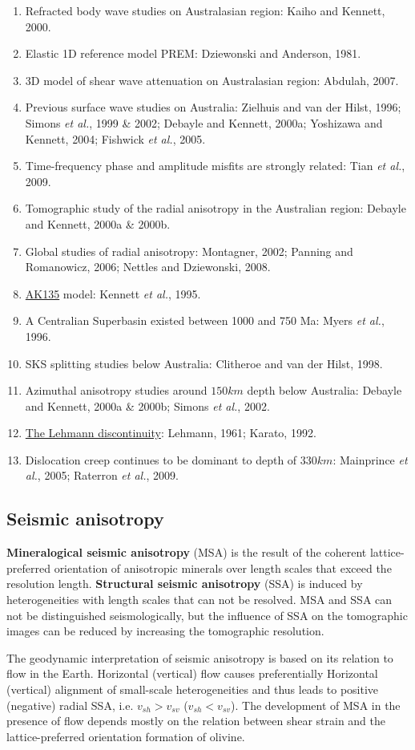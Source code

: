 \documentclass{article}
\newcommand{\myem}[1]{{\color{red}\uline{#1}}}
\newcommand{\etal}{\textit{et al.}}
\begin{document}
\begin{enumerate}[\hspace{10mm}*]
  \item Refracted body wave studies on Australasian region: Kaiho and Kennett, 2000.
  \item Elastic 1D reference model PREM: Dziewonski and Anderson, 1981.
  \item 3D model of shear wave attenuation on Australasian region: Abdulah, 2007.
  \item Previous surface wave studies on Australia: Zielhuis and van der Hilst, 1996; Simons \etal, 1999 \& 2002; Debayle and Kennett, 2000a; Yoshizawa and Kennett, 2004; Fishwick \etal, 2005. 
  \item Time-frequency phase and amplitude misfits are strongly related: Tian \etal, 2009.
  \item Tomographic study of the radial anisotropy in the Australian region: Debayle and Kennett, 2000a \& 2000b.
  \item Global studies of radial anisotropy: Montagner, 2002; Panning and Romanowicz, 2006; Nettles and Dziewonski, 2008.
  \item \myem{AK135} model: Kennett \etal, 1995.
  \item A Centralian Superbasin existed between 1000 and 750 Ma: Myers \etal, 1996.
  \item SKS splitting studies below Australia: Clitheroe and van der Hilst, 1998.
  \item Azimuthal anisotropy studies around $150km$ depth below Australia: Debayle and Kennett, 2000a \& 2000b; Simons \etal, 2002.
  \item \myem{The Lehmann discontinuity}: Lehmann, 1961; Karato, 1992.
  \item Dislocation creep continues to be dominant to depth of $330km$: Mainprince \etal, 2005; Raterron \etal, 2009.
\end{enumerate}\par
\subsection{Seismic anisotropy}
\textbf{Mineralogical seismic anisotropy} (MSA) is the result of the coherent lattice-preferred orientation of anisotropic minerals over length scales that exceed the resolution length. \textbf{Structural seismic anisotropy} (SSA) is induced by heterogeneities with length scales that can not be resolved. MSA and SSA can not be distinguished seismologically, but the influence of SSA on the tomographic images can be reduced by increasing the tomographic resolution.\par
The geodynamic interpretation of seismic anisotropy is based on its relation to flow in the Earth. Horizontal (vertical) flow causes preferentially Horizontal (vertical) alignment of small-scale heterogeneities and thus leads to positive (negative) radial SSA, i.e. $v_{sh}>v_{sv}$ ($v_{sh}<v_{sv}$). The development of MSA in the presence of flow depends mostly on the relation between shear strain and the lattice-preferred orientation formation of olivine.\par
\end{document}
